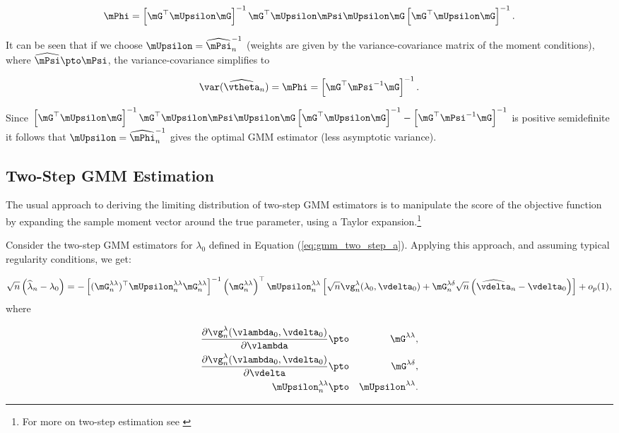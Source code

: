\documentclass[english,12pt]{book}\usepackage[]{graphicx}\usepackage[]{xcolor}
\begin{document}
\begin{equation*}
\mPhi = \left[\mG^\top\mUpsilon\mG\right]^{-1}\mG^\top\mUpsilon\mPsi\mUpsilon\mG\left[\mG^\top\mUpsilon\mG\right]^{-1}. 
\end{equation*}

It can be seen that if we choose $\mUpsilon = \widehat{\mPsi}^{-1}_n$ (weights are given by the variance-covariance matrix of the moment conditions), where $\widehat{\mPsi}\pto \mPsi$, the variance-covariance simplifies to

\begin{equation*}
\var(\widehat{\vtheta}_n) = \mPhi = \left[\mG^\top\mPsi^{-1}\mG\right]^{-1}.
\end{equation*}

Since $\left[\mG^\top\mUpsilon\mG\right]^{-1}\mG^\top\mUpsilon\mPsi\mUpsilon\mG\left[\mG^\top\mUpsilon\mG\right]^{-1} - \left[\mG^\top\mPsi^{-1}\mG\right]^{-1}$ is positive semidefinite it follows that $\mUpsilon = \widehat{\mPhi}^{-1}_n$ gives the optimal GMM estimator (less asymptotic variance).

\subsection{Two-Step GMM Estimation}\label{section:2step-gmm}

The usual approach to deriving the limiting distribution of two-step GMM estimators is to manipulate the score of the objective function by expanding the sample moment vector around the true parameter, using a Taylor expansion.\footnote{For more on two-step estimation see \citet[][section 6]{newey1994large}}

Consider the two-step GMM estimators for $\lambda_0$ defined in Equation (\ref{eq:gmm_two_step_a}). Applying this approach, and assuming typical regularity conditions, we get:

\begin{equation}\label{eq:taylor_gmm_1}
\sqrt{n}\left(\widehat{\lambda}_n - \lambda_0\right) = - \left[(\mG_n^{\lambda\lambda})^\top\mUpsilon_n^{\lambda\lambda}\mG_n^{\lambda\lambda}\right]^{-1}\left(\mG_n^{\lambda\lambda}\right)^\top\mUpsilon_n^{\lambda\lambda}\left[\sqrt{n}\vg_n^{\lambda}(\lambda_0, \vdelta_0) + \mG_n^{\lambda\delta}\sqrt{n}\left(\widehat{\vdelta}_n - \vdelta_0\right)\right] + o_p(1),
\end{equation}
%
where

\begin{eqnarray*}
	\frac{\partial \vg_n^{\lambda}(\vlambda_0, \vdelta_0)}{\partial \vlambda} &\pto&  \mG^{\lambda\lambda}, \\
	\frac{\partial \vg_n^{\lambda}(\vlambda_0, \vdelta_0)}{\partial \vdelta} &\pto&  \mG^{\lambda\delta}, \\
	\mUpsilon^{\lambda\lambda}_n & \pto & \mUpsilon^{\lambda\lambda}.
\end{eqnarray*}
\end{document}
